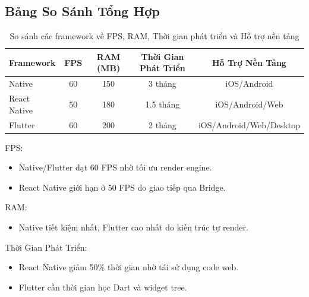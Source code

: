 \subsection{Bảng So Sánh Tổng Hợp}
\renewcommand{\labelitemi}{--}    
\begin{table}[H]
  \centering
  \begin{tabular}{|l|c|c|c|c|}
  \hline
  \textbf{Framework} & \textbf{FPS} & \textbf{RAM (MB)} & \textbf{Thời Gian Phát Triển} & \textbf{Hỗ Trợ Nền Tảng} \\
  \hline
  Native       & 60          & 150               & 3 tháng                      & iOS/Android \\
  React Native & 50          & 180               & 1.5 tháng                    & iOS/Android/Web \\
  Flutter      & 60          & 200               & 2 tháng                      & iOS/Android/Web/Desktop \\
  \hline
  \end{tabular}
  \caption{So sánh các framework về FPS, RAM, Thời gian phát triển và Hỗ trợ nền tảng}
  \end{table}
  

    \begin{flushleft}
      \hspace*{0.8cm}FPS:
      \setlength{\leftmargini}{1.5cm}
      \begin{itemize}
          \item Native/Flutter đạt 60 FPS nhờ tối ưu render engine.
          \item React Native giới hạn ở 50 FPS do giao tiếp qua Bridge.
      \end{itemize}
    \end{flushleft}

    \begin{flushleft}
      \hspace*{0.8cm}RAM:
      \setlength{\leftmargini}{1.5cm}
      \begin{itemize}
          \item Native tiết kiệm nhất, Flutter cao nhất do kiến trúc tự render.
      \end{itemize}
    \end{flushleft}

    \begin{flushleft}
      \hspace*{0.8cm}Thời Gian Phát Triển:
      \setlength{\leftmargini}{1.5cm}
      \begin{itemize}
          \item React Native giảm 50\% thời gian nhờ tái sử dụng code web.
          \item Flutter cần thời gian học Dart và widget tree.
      \end{itemize}
    \end{flushleft}

